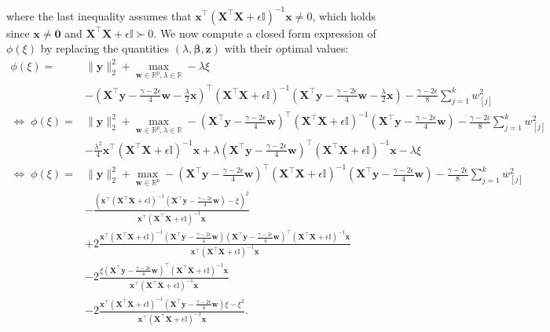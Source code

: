 \documentclass[opre,nonblindrev]{informs3} %
\begin{document}
where the last inequality assumes that $\bm{x}^\top \left(\bm{X}^\top \bm{X}+\epsilon\mathbb{I}\right)^{-1}\bm{x}\neq 0$, which holds since $\bm{x}\neq \bm{0}$ and $\bm{X}^\top \bm{X}+\epsilon\mathbb{I}\succ 0$. We now compute a closed form expression of $\phi(\xi)$ by replacing the quantities $(\lambda,\bm{\beta},\bm{z})$ with their optimal values:
\begin{align*}
\phi(\xi)=&\|\bm{y}\|_2^2+\max_{\bm{w}\in \mathbb{R}^p,\lambda\in \mathbb{R}}-\lambda\xi\\
&-\left(\bm{X}^\top \bm{y}-\frac{\gamma-2\epsilon}{4}\bm{w}-\frac{\lambda}{2} \bm{x}\right)^\top  \left(\bm{X}^\top \bm{X}+\epsilon\mathbb{I}\right)^{-1}\left(\bm{X}^\top \bm{y}-\frac{\gamma-2\epsilon}{4}\bm{w}-\frac{\lambda}{2} \bm{x}\right)-\frac{\gamma-2\epsilon}{8}\sum_{j=1}^k w_{[j]}^2\\
\Leftrightarrow\;\phi(\xi)=&\|\bm{y}\|_2^2+\max_{\bm{w}\in \mathbb{R}^p,\lambda\in \mathbb{R}}-\left(\bm{X}^\top \bm{y}-\frac{\gamma-2\epsilon}{4}\bm{w}\right)^\top  \left(\bm{X}^\top \bm{X}+\epsilon\mathbb{I}\right)^{-1}\left(\bm{X}^\top \bm{y}-\frac{\gamma-2\epsilon}{4}\bm{w}\right)-\frac{\gamma-2\epsilon}{8}\sum_{j=1}^k w_{[j]}^2\\
&-\frac{\lambda^2}{4}\bm{x^\top} \left(\bm{X}^\top \bm{X}+\epsilon\mathbb{I}\right)^{-1}\bm{x}+\lambda \left(\bm{X}^\top \bm{y}-\frac{\gamma-2\epsilon}{4}\bm{w}\right)^\top  \left(\bm{X}^\top \bm{X}+\epsilon\mathbb{I}\right)^{-1}\bm{x}-\lambda\xi\\
\Leftrightarrow\;\phi(\xi)=&\|\bm{y}\|_2^2+\max_{\bm{w}\in \mathbb{R}^p}-\left(\bm{X}^\top \bm{y}-\frac{\gamma-2\epsilon}{4}\bm{w}\right)^\top  \left(\bm{X}^\top \bm{X}+\epsilon\mathbb{I}\right)^{-1}\left(\bm{X}^\top \bm{y}-\frac{\gamma-2\epsilon}{4}\bm{w}\right)-\frac{\gamma-2\epsilon}{8}\sum_{j=1}^k w_{[j]}^2\\
&-\frac{\left(\bm{x}^\top  \left(\bm{X}^\top \bm{X}+\epsilon\mathbb{I}\right)^{-1}\left(\bm{X}^\top \bm{y}-\frac{\gamma-2\epsilon}{4}\bm{w}\right)-\xi\right)^2}{\bm{x^\top} \left(\bm{X}^\top \bm{X}+\epsilon\mathbb{I}\right)^{-1}\bm{x}}\\
&+2\frac{\bm{x}^\top  \left(\bm{X}^\top \bm{X}+\epsilon\mathbb{I}\right)^{-1}\left(\bm{X}^\top \bm{y}-\frac{\gamma-2\epsilon}{4}\bm{w}\right)\left(\bm{X}^\top \bm{y}-\frac{\gamma-2\epsilon}{4}\bm{w}\right)^\top  \left(\bm{X}^\top \bm{X}+\epsilon\mathbb{I}\right)^{-1}\bm{x}}{\bm{x}^\top  \left(\bm{X}^\top \bm{X}+\epsilon\mathbb{I}\right)^{-1}\bm{x}} \\
&-2\frac{\xi\left(\bm{X}^\top \bm{y}-\frac{\gamma-2\epsilon}{4}\bm{w}\right)^\top  \left(\bm{X}^\top \bm{X}+\epsilon\mathbb{I}\right)^{-1}\bm{x}}{\bm{x}^\top  \left(\bm{X}^\top \bm{X}+\epsilon\mathbb{I}\right)^{-1}\bm{x}} \\
&-2\frac{\bm{x}^\top  \left(\bm{X}^\top \bm{X}+\epsilon\mathbb{I}\right)^{-1}\left(\bm{X}^\top \bm{y}-\frac{\gamma-2\epsilon}{4}\bm{w}\right)\xi-\xi^2}{\bm{x}^\top  \left(\bm{X}^\top \bm{X}+\epsilon\mathbb{I}\right)^{-1}\bm{x}}.
\end{align*}
\end{document}
